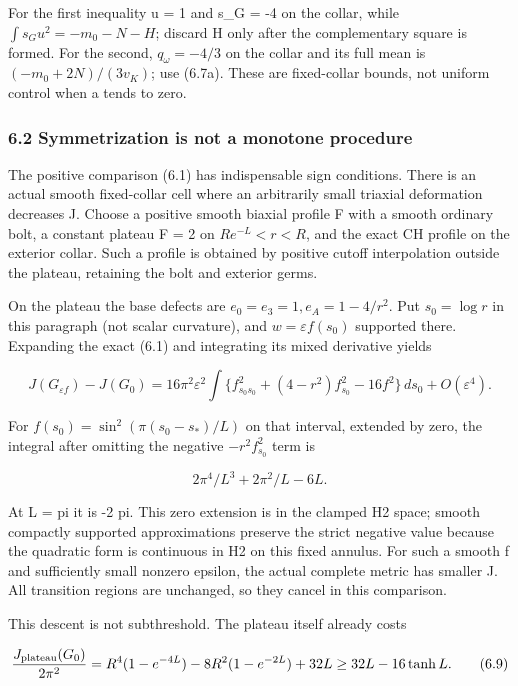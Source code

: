 \documentclass[
  10pt,
]{article}
\begin{document}
For the first inequality u = 1 and s\_G = -4 on the collar, while
\(\int s_Gu^2=-m_0-N-H\); discard H only after the complementary square
is formed. For the second, \(q_\omega=-4/3\) on the collar and its full
mean is \((-m_0+2N)/(3v_K)\); use (6.7a). These are fixed-collar bounds,
not uniform control when a tends to zero.

\hypertarget{symmetrization-is-not-a-monotone-procedure}{%
\subsubsection{6.2 Symmetrization is not a monotone
procedure}\label{symmetrization-is-not-a-monotone-procedure}}

The positive comparison (6.1) has indispensable sign conditions. There
is an actual smooth fixed-collar cell where an arbitrarily small
triaxial deformation decreases J. Choose a positive smooth biaxial
profile F with a smooth ordinary bolt, a constant plateau F = 2 on
\(R e^{-L}<r<R\), and the exact CH profile on the exterior collar. Such
a profile is obtained by positive cutoff interpolation outside the
plateau, retaining the bolt and exterior germs.

On the plateau the base defects are \(e_0=e_3=1,e_A=1-4/r^2\). Put
\(s_0=\log r\) in this paragraph (not scalar curvature), and
\(w=\varepsilon f(s_0)\) supported there. Expanding the exact (6.1) and
integrating its mixed derivative yields

\[
 J(G_{\varepsilon f})-J(G_0)
 =16\pi^2\varepsilon^2\int
       \{f_{s_0s_0}^2+(4-r^2)f_{s_0}^2-16f^2\}\,ds_0
       +O(\varepsilon^4).                                \tag{6.8}
\]

For \(f(s_0)=\sin^2(\pi(s_0-s_*)/L)\) on that interval, extended by
zero, the integral after omitting the negative \(-r^2f_{s_0}^2\) term is

\[
                   2\pi^4/L^3+2\pi^2/L-6L.
\]

At L = pi it is -2 pi. This zero extension is in the clamped H2 space;
smooth compactly supported approximations preserve the strict negative
value because the quadratic form is continuous in H2 on this fixed
annulus. For such a smooth f and sufficiently small nonzero epsilon, the
actual complete metric has smaller J. All transition regions are
unchanged, so they cancel in this comparison.

This descent is not subthreshold. The plateau itself already costs

\[
 \frac{J_{\rm plateau}(G_0)}{2\pi^2}
 =R^4(1-e^{-4L})-8R^2(1-e^{-2L})+32L
 \ge32L-16\tanh L.                                      \tag{6.9}
\]
\end{document}

